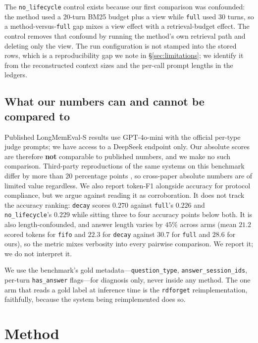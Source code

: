 \documentclass[11pt]{article}
\newcommand{\arm}[1]{\texttt{#1}}
\begin{document}
The \arm{no\_lifecycle} control exists because our first comparison was confounded: the method used a 20-turn BM25 budget plus a view while \arm{full} used 30 turns, so a method-versus-\arm{full} gap mixes a view effect with a retrieval-budget effect. The control removes that confound by running the method's own retrieval path and deleting only the view. The run configuration is not stamped into the stored rows, which is a reproducibility gap we note in \S\ref{sec:limitations}; we identify it from the reconstructed context sizes and the per-call prompt lengths in the ledgers.

\subsection{What our numbers can and cannot be compared to}
\label{sec:comparability}

Published LongMemEval-S results use GPT-4o-mini with the official per-type judge prompts; we have access to a DeepSeek endpoint only. Our absolute scores are therefore \textbf{not} comparable to published numbers, and we make no such comparison. Third-party reproductions of the same systems on this benchmark differ by more than 20 percentage points \citep{memdelta}, so cross-paper absolute numbers are of limited value regardless. We also report token-F1 alongside accuracy for protocol compliance, but we argue against reading it as corroboration. It does not track the accuracy ranking: \arm{decay} scores $0.270$ against \arm{full}'s $0.226$ and \arm{no\_lifecycle}'s $0.229$ while sitting three to four accuracy points below both. It is also length-confounded, and answer length varies by $45\%$ across arms (mean $21.2$ scored tokens for \arm{fifo} and $22.3$ for \arm{decay} against $30.7$ for \arm{full} and $28.6$ for ours), so the metric mixes verbosity into every pairwise comparison. We report it; we do not interpret it.

We use the benchmark's gold metadata---\texttt{question\_type}, \texttt{answer\_session\_ids}, per-turn \texttt{has\_answer} flags---for diagnosis only, never inside any method. The one arm that reads a gold label at inference time is the \arm{rdforget} reimplementation, faithfully, because the system being reimplemented does so.

\section{Method}
\label{sec:method}
\end{document}
